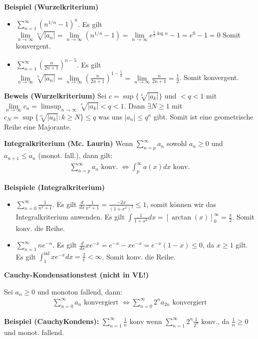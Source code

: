 \documentclass[25pt]{sciposter}
\newcommand{\limm}{\lim\limits_{n \to \infty}}
\newenvironment{method}[1]{\begin{mdframed}[backgroundcolor=blue!10,innertopmargin=15pt, innerbottommargin=15pt, nobreak=true]
		\textbf{#1 }
	}
	{ 
	\end{mdframed}
}
\begin{document}
\begin{multicols}{3}
\textbf{Beispiel (Wurzelkriterium)}
\begin{itemize}
	\item $\sum_{n=1}^{\infty} \left( n^{1/n} -1 \right)^n $. Es gilt $\limm \sqrt[n]{|a_n|} = \limm (n^{1/n}-1) = \limm e^{\frac{1}{n}\log n} -1 = e^0-1 = 0$ Somit konvergent.
	
	\item $\sum_{n=1}^{\infty} \left(\frac{n}{2n+1}\right) ^{n-5}$. Es gilt $\limm \sqrt[n]{|a_n|} = \limm \left( \frac{n}{2n+1} \right)^{1-\frac{5}{n}} = \limm\frac{n}{2n+1} = \frac{1}{2}$. Somit konvergent.
\end{itemize}


\textbf{Beweis (Wurzelkriterium)}
Sei $c = \sup \{\sqrt[k]{|a_k|}\}$ und $ < q< 1$ mit $\limm c_n = \limsup_{n\to \infty} \sqrt[k]{|a_k|} < q <1$. Dann $\exists N \geq 1$ mit $ c_N = \sup\{ \sqrt[k]{|a_k|}: k\geq N \} \leq q$ was uns $|a_n| \leq q^n$ gibt. Somit ist eine geometrische Reihe eine Majorante.


\begin{method}{Integralkriterium (Mc. Laurin)} Wenn $\sum_{n=p}^{\infty} a_n$ sowohl $a_n \geq 0$ und $a_{n+1} \leq a_n$ (monot. fall.), dann gilt:
	\begin{align*}
		\sum_{n=p}^{\infty} a_n \text{ konv. } \iff \int_{p}^{\infty} a(x) dx \text{ konv.}
	\end{align*}
\end{method}
\textbf{Beispiele (Integralkriterium)}
\begin{itemize}
	\item $\sum_{n=0}^{\infty} \frac{1}{n^2 + 1}$. Es gilt $\frac{d}{dx} \frac{1}{x^2 + 1} = \frac{-2x}{(1+x^2)^2} \leq 1$, somit können wir das Integralkriterium anwenden. Es gilt $\int \frac{1}{1+x^2}dx = [\arctan(x)]_0 ^\infty = \frac{\pi}{2}$. Somit konv. die Reihe.
	\item $\sum_{n=1}^{\infty} ne^{-n}$. Es gilt $\frac{d}{dx} xe^{-x} = e^{-x} - xe^{-x}= e^{-x}(1-x) \leq 0$, da $x\geq 1$ gilt. Es gilt $ \int_{1}^{\inf}xe^{-x}dx = \frac{2}{e} <\infty$. Somit konv. die Reihe.
\end{itemize}

\begin{method}{Cauchy-Kondensationstest (nicht in VL!)}
	Sei $a_n \geq 0$ und monoton fallend, dann:
	\begin{align*}
		\sum_{n=0}^{\infty} a_n \text{ konvergiert } \iff \sum_{n=0}^{\infty} 2^n a_{2n} \text{ konvergiert}
	\end{align*}
\end{method}
\textbf{Beispiel (CauchyKondens):} $\sum_{n=1}^{\infty} \frac{1}{n}$ konv wenn $\sum_{n=1}^{\infty} 2^n \frac{1}{2^n}$ konv., da $\frac{1}{n}\geq 0$ und monot. fallend. 



\end{multicols}
\end{document}
